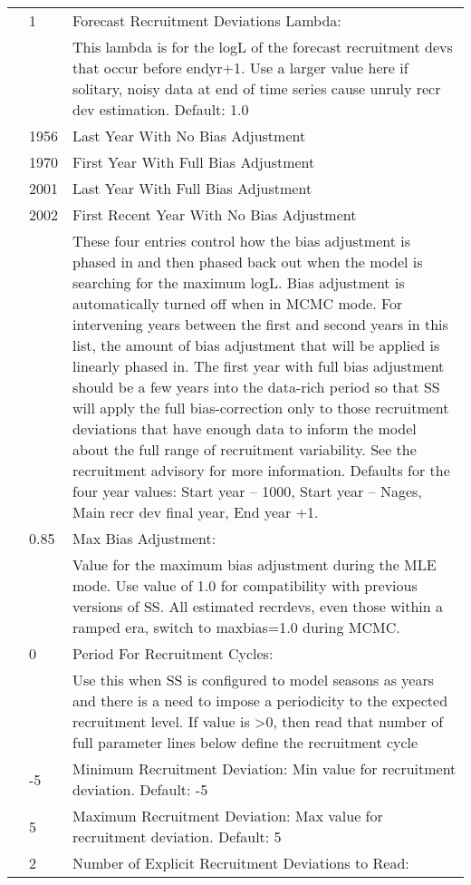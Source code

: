 \begin{center}
\begin{longtable}{p{1cm} p{3cm} p{11cm}}
		& 1 & Forecast Recruitment Deviations Lambda:\\
		&   & This lambda is for the logL of the forecast recruitment devs that occur before endyr+1.  Use a larger value here if solitary, noisy data at end of time series cause unruly recr dev estimation. Default:  1.0 \\
		& 1956 & Last Year With No Bias Adjustment \\
		& 1970 & First Year With Full Bias Adjustment \\
		& 2001 & Last Year With Full Bias Adjustment \\
		& 2002 & First Recent Year With No Bias Adjustment \\
		&      & These four entries control how the bias adjustment is phased in and then phased back out when the model is searching for the maximum logL.  Bias adjustment is automatically turned off when in MCMC mode.  For intervening years between the first and second years in this list, the amount of bias adjustment that will be applied is linearly phased in.  The first year with full bias adjustment should be a few years into the data-rich period so that SS will apply the full bias-correction only to those recruitment deviations that have enough data to inform the model about the full range of recruitment variability.  See the recruitment advisory for more information.
		Defaults for the four year values: Start year – 1000, Start year – Nages, Main recr dev final year, End year +1.\\
		& 0.85 & Max Bias Adjustment: \\
		&      & Value for the maximum bias adjustment during the MLE mode.  Use value of 1.0 for compatibility with previous versions of SS.  All estimated recrdevs, even those within a ramped era, switch to maxbias=1.0 during MCMC.\\
		& 0    & Period For Recruitment Cycles: \\
		&      & Use this when SS is configured to model seasons as years and there is a need to impose a periodicity to the expected recruitment level.  If value is >0, then read that number of full parameter lines below define the recruitment cycle \\
		& -5   & Minimum Recruitment Deviation: Min value for recruitment deviation. Default: -5\\
		& 5    & Maximum Recruitment Deviation: Max value for recruitment deviation. Default: 5\\
		& 2    & Number of Explicit Recruitment Deviations to Read:\\

\end{longtable}
\end{center}
